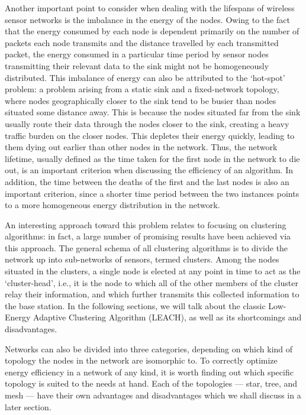 \documentclass{article}
\begin{document}
Another important point to consider when dealing with the lifespans of wireless sensor networks is the imbalance in the energy of the nodes. Owing to the fact that the energy consumed by each node is dependent primarily on the number of packets each node transmits and the distance travelled by each transmitted packet, the energy consumed in a particular time period by sensor nodes transmitting their relevant data to the sink might not be homogeneously distributed. This imbalance of energy can also be attributed to the ‘hot-spot’ problem: a problem arising from a static sink and a fixed-network topology, where nodes geographically closer to the sink tend to be busier than nodes situated some distance away. This is because the nodes situated far from the sink usually route their data through the nodes closer to the sink, creating a heavy traffic burden on the closer nodes. This depletes their energy quickly, leading to them dying out earlier than other nodes in the network. Thus, the network lifetime, usually defined as the time taken for the first node in the network to die out, is an important criterion when discussing the efficiency of an algorithm. In addition, the time between the deaths of the first and the last nodes is also an important criterion, since a shorter time period between the two instances points to a more homogeneous energy distribution in the network. 

An interesting approach toward this problem relates to focusing on clustering algorithms: in fact, a large number of promising results have been achieved via this approach. The general schema of all clustering algorithms is to divide the network up into sub-networks of sensors, termed clusters. Among the nodes situated in the clusters, a single node is elected at any point in time to act as the ‘cluster-head’, i.e., it is the node to which all of the other members of the cluster relay their information, and which further transmits this collected information to the base station. In the following sections, we will talk about the classic Low-Energy Adaptive Clustering Algorithm (LEACH), as well as its shortcomings and disadvantages. 

Networks can also be divided into three categories, depending on which kind of topology the nodes in the network are isomorphic to. To correctly optimize energy efficiency in a network of any kind, it is worth finding out which specific topology is suited to the needs at hand. Each of the topologies — star, tree, and mesh — have their own advantages and disadvantages which we shall discuss in a later section. 
\end{document}
